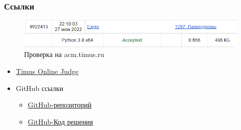 \documentclass{beamer}
\begin{document}
	\begin{frame}
		\frametitle{Ссылки}
		\begin{figure}
			\includegraphics[scale=0.6]{accepted}
			\caption{Проверка на acm.timus.ru}
		\end{figure}
		\begin{itemize}
			\item \href{https://acm.timus.ru/}{Timus Online Judge}
			\item {GitHub ссылки
			\begin{itemize}
			\item \href{https://acm.timus.ru/}{GitHub-репозиторий}
			\item \href{https://github.com/Nelifax/Summer-practice/blob/58ef02507143101c32afc2fd39323e81d402ca8e/MVS_Python3x/practice/practice/practice.py}{GitHub-Код решения}
			\end{itemize}}
		\end{itemize}
	\end{frame}
\end{document}
